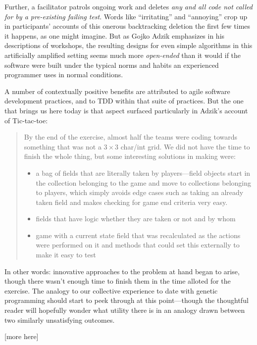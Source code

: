 Further, a facilitator patrols ongoing work and deletes \emph{any and all code not called for by a pre-existing failing test}. Words like ``irritating'' and ``annoying'' crop up in participants' accounts of  this onerous backtracking deletion the first few times it happens, as one might imagine. But as Gojko Adzik emphasizes in his descriptions of workshops, the resulting designs for even simple algorithms in this artificially amplified setting seems much more \emph{open-ended} than it would if the software were built under the typical norms and habits an experienced programmer uses in normal conditions.

A number of contextually positive benefits are attributed to agile software development practices, and to TDD within that suite of practices. But the one that brings us here today is that aspect surfaced particularly in Adzik's account of Tic-tac-toe:

\begin{quotation}
By the end of the exercise, almost half the teams were coding towards something that was not a $3\times 3$ char/int grid. We did not have the time to finish the whole thing, but some interesting solutions in making were:

\begin{itemize}
\item a bag of fields that are literally taken by players---field objects start in the collection belonging to the game and move to collections belonging to players, which simply avoids edge cases such as taking an already taken field and makes checking for game end criteria very easy.
\item fields that have logic whether they are taken or not and by whom
\item game with a current state field that was recalculated as the actions were performed on it and methods that could set this externally to make it easy to test
\end{itemize}
\end{quotation}

In other words: innovative approaches to the problem at hand began to arise, though there wasn't enough time to finish them in the time alloted for the exercise. The analogy to our collective experience to date with genetic programming should start to peek through at this point---though the thoughtful reader will hopefully wonder what utility there is in an analogy drawn between two similarly unsatisfying outcomes.

[more here]


